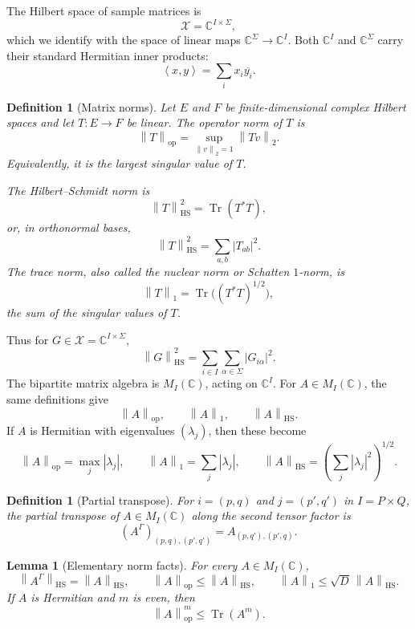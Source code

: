 \documentclass[11pt,oneside]{book}
\newtheorem{lemma}[theorem]{Lemma}
\newtheorem{definition}[theorem]{Definition}
\DeclareMathOperator{\Tr}{Tr}
\newcommand{\C}{\mathbb C}
\newcommand{\1}{\mathbf 1}
\newcommand{\pt}{\Gamma}
\newcommand{\HS}{\mathrm{HS}}
\newcommand{\op}{\mathrm{op}}
\newcommand{\norm}[1]{\left\|#1\right\|}
\newcommand{\ip}[2]{\left\langle #1,#2\right\rangle}
\begin{document}
The Hilbert space of sample matrices is
\[
  \mathcal X=\C^{I\times \Sigma},
\]
which we identify with the space of linear maps
\(\C^\Sigma\to\C^I\).  Both \(\C^I\) and \(\C^\Sigma\) carry their standard
Hermitian inner products:
\[
  \ip{x}{y}=\sum_i x_i\overline{y_i}.
\]

\begin{definition}[Matrix norms]
Let \(E\) and \(F\) be finite-dimensional complex Hilbert spaces and let
\(T:E\to F\) be linear.  The operator norm of \(T\) is
\[
  \norm T_{\op}=\sup_{\norm v_2=1}\norm{Tv}_2.
\]
Equivalently, it is the largest singular value of \(T\).

The Hilbert--Schmidt norm is
\[
  \norm T_{\HS}^2=\Tr(T^*T),
\]
or, in orthonormal bases,
\[
  \norm T_{\HS}^2=\sum_{a,b}|T_{ab}|^2.
\]
The trace norm, also called the nuclear norm or Schatten \(1\)-norm, is
\[
  \norm T_1=\Tr\bigl((T^*T)^{1/2}\bigr),
\]
the sum of the singular values of \(T\).
\end{definition}

Thus for \(G\in\mathcal X=\C^{I\times\Sigma}\),
\[
  \norm{G}_{\HS}^2=\sum_{i\in I}\sum_{\alpha\in\Sigma}|G_{i\alpha}|^2.
\]
The bipartite matrix algebra is \(M_I(\C)\), acting on \(\C^I\).  For
\(A\in M_I(\C)\), the same definitions give
\[
  \norm A_{\op},\qquad \norm A_1,\qquad \norm A_{\HS}.
\]
If \(A\) is Hermitian with eigenvalues \((\lambda_j)\), then these become
\[
  \norm A_{\op}=\max_j|\lambda_j|,\qquad
  \norm A_1=\sum_j|\lambda_j|,\qquad
  \norm A_{\HS}=\left(\sum_j|\lambda_j|^2\right)^{1/2}.
\]

\begin{definition}[Partial transpose]
For \(i=(p,q)\) and \(j=(p',q')\) in \(I=P\times Q\), the partial transpose of
\(A\in M_I(\C)\) along the second tensor factor is
\[
  (A^\pt)_{(p,q),(p',q')}=A_{(p,q'),(p',q)} .
\]
\end{definition}

\begin{lemma}[Elementary norm facts]
For every \(A\in M_I(\C)\),
\[
  \norm{A^\pt}_{\HS}=\norm A_{\HS},\qquad
  \norm A_{\op}\le \norm A_{\HS},\qquad
  \norm A_1\le \sqrt D\,\norm A_{\HS}.
\]
If \(A\) is Hermitian and \(m\) is even, then
\[
  \norm A_{\op}^m\le \Tr(A^m).
\]
\end{lemma}
\end{document}
